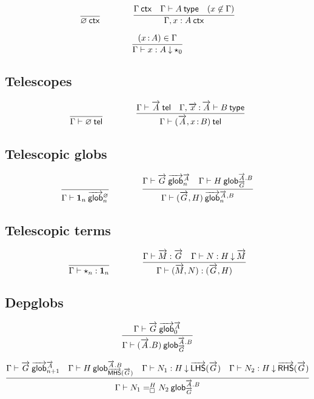 \begin{small}
  \[
  \infer{\wfctx{\varnothing}}{}
  \qquad\qquad
  \infer{\wfctx{\Gamma,x:A}}
  {\wfctx{\Gamma}
    & \wftype{\Gamma}{A}
    & (x\not\in\Gamma)}
  \]

\[
\infer{\ofdepglob{\Gamma}{x}{A}{\unitglobelt 0}}{(\tptm xA)\in\Gamma}
\]
\end{small}

\subsection{Telescopes}

\begin{small}
  \[
  \infer{\wftel{\Gamma}{\emptytel}}{}
  \qquad\qquad
  \infer
    {\wftel{\Gamma}{(\tel A,\tptm{x}{B})}}
    {\wftel{\Gamma}{\tel A}
    & \wftype{\Gamma,\teltm xA}{B}}
  \]
\end{small}

\subsection{Telescopic globs}

\begin{small}
  \[
  \infer
    {\wfglob{\Gamma}{\unitglob n}{\emptytel}n}
    {}
  \qquad\qquad
  \infer
    {\wfglob{\Gamma}{(\tel G,H)}{\tel A,B}n}
    {\wfglob{\Gamma}{\tel G}{\tel A}n
    &\wfdepglob{\Gamma}{H}{\tel A.B}{\tel G}}
  \]
\end{small}

\subsection{Telescopic terms}

\begin{small}
  \[
  \infer
    {\ofglob{\Gamma}{\unitglobelt n}{\unitglob n}}
    {}
  \qquad\qquad
  \infer
    {\ofglob{\Gamma}{(\tel M,N)}{(\tel G,H)}}
    {\ofglob{\Gamma}{\tel M}{\tel G}
    &\ofdepglob{\Gamma}{N}{H}{\tel M}}
  \]
\end{small}

\subsection{Depglobs}

\begin{small}
\[
\infer
  {\wfdepglob{\Gamma}{(\tel A.B)}{\tel{A}.B}{\tel{G}}}
  {\wfglob{\Gamma}{\tel G}{\tel A}0}
\]

\[
\infer
  {\wfdepglob{\Gamma}{\dhomj{H}{N_1}{N_2}{\blank}}{\tel A.B}{\tel G}}
  {\wfglob{\Gamma}{\tel G}{\tel A}{n+1}
  &\wfdepglob{\Gamma}{H}{\tel A.B}{\mhs{\tel G}}
  &\ofdepglob{\Gamma}{N_1}{H}{\lhs{\tel G}}
  &\ofdepglob{\Gamma}{N_2}{H}{\rhs{\tel G}}}
\]
\end{small}

